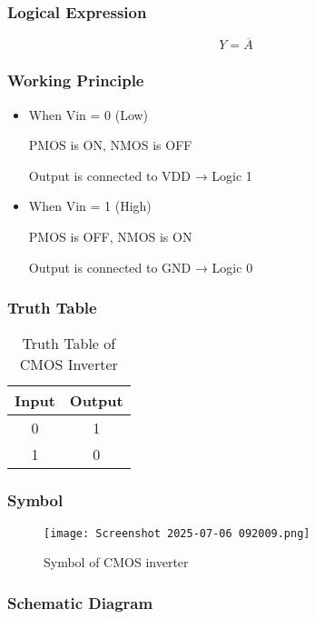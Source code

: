 \documentclass[12pt]{article}
\begin{document}
\subsubsection{Logical Expression}
\[
Y= \overline{A}
\]


\subsubsection{\textbf{Working Principle}}
\begin{itemize}
    \item When Vin = 0 (Low)

            PMOS is ON, NMOS is OFF
            
            Output is connected to VDD → Logic 1

\item 
        When Vin = 1 (High)
        
        PMOS is OFF, NMOS is ON
        
        Output is connected to GND → Logic 0
\end{itemize} 

\subsubsection{\textbf{Truth Table}}
\begin{table}[h!]
\centering
{}
\begin{tabular}{|c|c|}
\hline
\textbf{Input} & \textbf{Output} \\
\hline
0 & 1 \\
1 & 0 \\
\hline
\end{tabular}
\caption{Truth Table of CMOS Inverter}
\end{table}

\subsubsection{\textbf{Symbol}}
\begin{figure}[h!]
    \centering
    \texttt{[image: Screenshot 2025-07-06 092009.png]}
    \caption{Symbol of CMOS inverter}
    \label{fig:enter-label}
\end{figure}

\subsubsection{\textbf{Schematic Diagram}}
\end{document}
